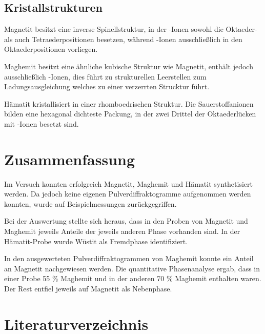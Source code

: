 \documentclass[12pt, a4paper]{article}
\begin{document}
\subsection{Kristallstrukturen}
Magnetit besitzt eine inverse Spinellstruktur, in der -Ionen sowohl die Oktaeder- als auch Tetraederpositionen besetzen, während -Ionen ausschließlich in den Oktaederpositionen vorliegen.

\noindent
Maghemit besitzt eine ähnliche kubische Struktur wie Magnetit, enthält jedoch ausschließlich -Ionen, dies führt zu strukturellen Leerstellen zum Ladungsausgleichung welches zu einer verzerrten Strucktur führt.

\noindent
Hämatit kristallisiert in einer rhomboedrischen Struktur. Die Sauerstoffanionen bilden eine hexagonal dichteste Packung, in der zwei Drittel der Oktaederlücken mit -Ionen besetzt sind.

\newpage
\section{Zusammenfassung}
Im Versuch konnten erfolgreich Magnetit, Maghemit und Hämatit synthetisiert werden. Da jedoch keine eigenen Pulverdiffraktogramme aufgenommen werden konnten, wurde auf Beispielmessungen zurückgegriffen.

\noindent
Bei der Auswertung stellte sich heraus, dass in den Proben von Magnetit und Maghemit jeweils Anteile der jeweils anderen Phase vorhanden sind. In der Hämatit-Probe wurde Wüstit als Fremdphase identifiziert.

\noindent
In den ausgewerteten Pulverdiffraktogrammen von Maghemit konnte ein Anteil an Magnetit nachgewiesen werden. Die quantitative Phasenanalyse ergab, dass in einer Probe 55 \% Maghemit und in der anderen 70 \% Maghemit enthalten waren. Der Rest entfiel jeweils auf Magnetit als Nebenphase.


\newpage
\section{Literaturverzeichnis}
\printbibliography
\end{document}
